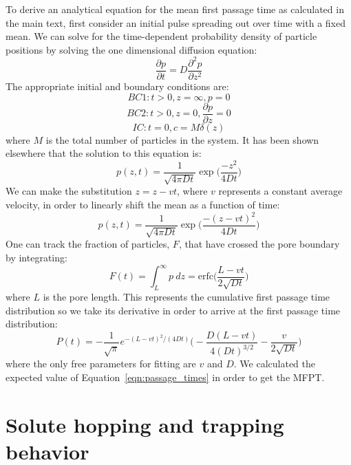 \documentclass{article}
\begin{document}
  To derive an analytical equation for the mean first passage time as calculated
  in the main text, first consider an initial pulse spreading out over time with
  a fixed mean. We can solve for the time-dependent probability density of 
  particle positions by solving the one dimensional diffusion equation:
  \begin{equation}
  \frac{\partial p}{\partial t} = D \frac{\partial^2 p}{\partial z^2}
  \end{equation}
  The appropriate initial and boundary conditions are:
  $$BC1: t > 0, z = \infty, p = 0$$
  $$BC2: t > 0, z = 0, \frac{\partial p}{\partial z} = 0$$
  $$IC: t = 0, c = M\delta(z)$$
  where $M$ is the total number of particles in the system. It has been shown 
  elsewhere that the solution to this equation is:~\cite{cussler_diffusion:_2009}
  \begin{equation}
  p(z, t) = \frac{1}{\sqrt{4 \pi D t}}\exp\bigg(\frac{-z^2}{4Dt}\bigg)
  \end{equation}
  We can make the substitution $z = z - vt$, where $v$ represents a constant average
  velocity, in order to linearly shift the mean as a function of time:
  \begin{equation}
  p(z, t) = \frac{1}{\sqrt{4 \pi D t}}\exp\bigg(\frac{-(z - vt)^2}{4Dt}\bigg)
  \end{equation}
  One can track the fraction of particles, $F$, that have crossed the pore 
  boundary by integrating:
  \begin{equation}
  F(t) = \int_L^\infty p~dz = \mathrm{erfc}\bigg(\frac{L - vt}{2\sqrt{D t}}\bigg)
  \end{equation}
  where $L$ is the pore length. This represents the cumulative first passage 
  time distribution so we take its derivative in order to arrive at the first
  passage time distribution:
  \begin{equation}
  P(t) = -\frac{1}{\sqrt{\pi}}e^{-(L - vt)^2 / (4Dt)}\bigg(-\frac{D(L - vt)}{4(Dt)^{3/2}} - \frac{v}{2\sqrt{Dt}}\bigg)
  \label{eqn:passage_times}
  \end{equation} 
  where the only free parameters for fitting are $v$ and $D$. We calculated the
  expected value of Equation~\ref{eqn:passage_times} in order to get the MFPT.
  
  \section{Solute hopping and trapping behavior}\label{section:sfbm_other_solutes}
  
\end{document}
